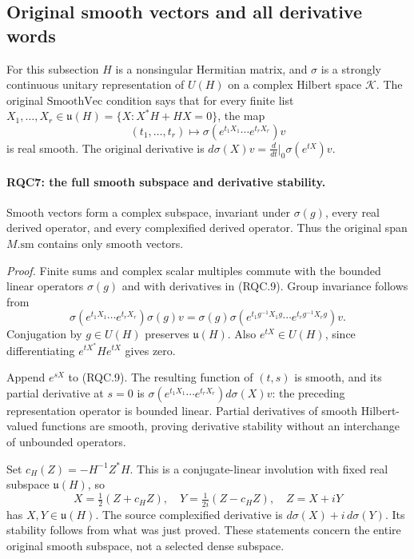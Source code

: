 \subsection{Original smooth vectors and all derivative words}

For this subsection \(H\) is a nonsingular Hermitian matrix, and
\(\sigma\) is a strongly continuous unitary representation of
\(U(H)\) on a complex Hilbert space \(\mathcal K\).
The original \(\mathrm{SmoothVec}\) condition says that for every
finite list \(X_1,\ldots,X_r\in
\mathfrak u(H)=\{X:X^*H+HX=0\}\), the map
\[
 (t_1,\ldots,t_r)\longmapsto
 \sigma(e^{t_1X_1}\cdots e^{t_rX_r})v
 \tag{RQC.9}
\]
is real smooth.  The original derivative is
\(d\sigma(X)v=\frac{d}{dt}|_0\sigma(e^{tX})v\).

\paragraph{RQC7: the full smooth subspace and derivative stability.}
\label{claim:RQC7}
Smooth vectors form a complex subspace, invariant under
\(\sigma(g)\), every real derived operator, and every complexified
derived operator.  Thus the original span \(M.\mathrm{sm}\)
contains only smooth vectors.

\emph{Proof.}
Finite sums and complex scalar multiples commute with the bounded
linear operators \(\sigma(g)\) and with derivatives in (RQC.9).
Group invariance follows from
\[
 \sigma(e^{t_1X_1}\cdots e^{t_rX_r})\sigma(g)v
 =\sigma(g)\sigma(e^{t_1g^{-1}X_1g}\cdots
                       e^{t_rg^{-1}X_rg})v.
 \tag{RQC.10}
\]
Conjugation by \(g\in U(H)\) preserves \(\mathfrak u(H)\).
Also \(e^{tX}\in U(H)\), since differentiating
\(e^{tX^*}He^{tX}\) gives zero.

Append \(e^{sX}\) to (RQC.9).  The resulting function of
\((t,s)\) is smooth, and its partial derivative at \(s=0\) is
\(\sigma(e^{t_1X_1}\cdots e^{t_rX_r})d\sigma(X)v\):
the preceding representation operator is bounded linear.
Partial derivatives of smooth Hilbert-valued functions are smooth,
proving derivative stability without an interchange of unbounded
operators.

Set \(c_H(Z)=-H^{-1}Z^*H\).  This is a conjugate-linear involution
with fixed real subspace \(\mathfrak u(H)\), so
\[
 X=\tfrac12(Z+c_HZ),\quad
 Y=\tfrac1{2i}(Z-c_HZ),\quad Z=X+iY
 \tag{RQC.11}
\]
has \(X,Y\in\mathfrak u(H)\).
The source complexified derivative is \(d\sigma(X)+i\,d\sigma(Y)\).
Its stability follows from what was just proved.  These statements
concern the entire original smooth subspace, not a selected dense
subspace.

